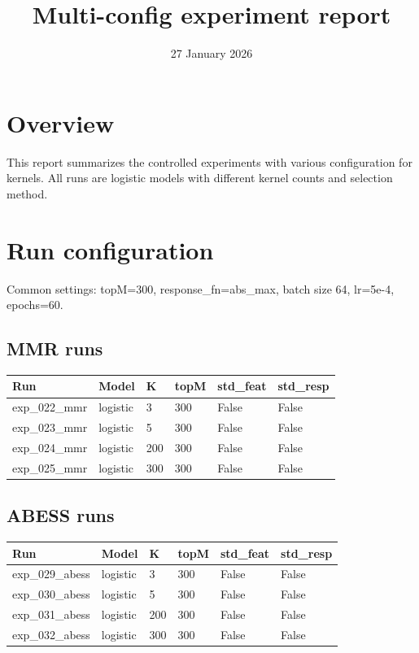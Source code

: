 \documentclass{article}
\begin{document}
\title{Multi-config experiment report}
\author{}
\date{27 January 2026}
\maketitle

\section*{Overview}
This report summarizes the controlled experiments with various configuration for kernels. All runs are logistic models with different kernel counts and selection method.

\section*{Run configuration}
Common settings: topM=300, response\_fn=abs\_max, batch size 64, lr=5e-4, epochs=60.

\subsection*{MMR runs}

\begin{center}
\begin{tabular}{llllll}
\toprule
Run & Model & K & topM & std\_feat & std\_resp \\
\midrule
exp\_022\_mmr & logistic & 3 & 300 & False & False \\
exp\_023\_mmr & logistic & 5 & 300 & False & False \\
exp\_024\_mmr & logistic & 200 & 300 & False & False \\
exp\_025\_mmr & logistic & 300 & 300 & False & False \\
\bottomrule
\end{tabular}
\end{center}

\subsection*{ABESS runs}
\begin{center}
\begin{tabular}{llllll}
\toprule
Run & Model & K & topM & std\_feat & std\_resp \\
\midrule
exp\_029\_abess & logistic & 3 & 300 & False & False \\
exp\_030\_abess & logistic & 5 & 300 & False & False \\
exp\_031\_abess & logistic & 200 & 300 & False & False \\
exp\_032\_abess & logistic & 300 & 300 & False & False \\
\bottomrule
\end{tabular}
\end{center}
\end{document}
